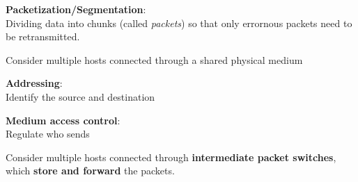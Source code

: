 \begin{frame}\begin{center}\large
	\textbf{Packetization/Segmentation}:\\ \large Dividing data into chunks (called \textit{packets}) 
	so that only errornous packets need to be retransmitted.
\end{center}\end{frame}

\begin{frame}[t]\normalsize
	Consider multiple hosts connected through a shared physical medium
\end{frame}

\begin{frame}\begin{center}\large
	\textbf{Addressing}:\\ Identify the source and destination
\end{center}\end{frame}

\begin{frame}\begin{center}\large
	\textbf{Medium access control}:\\ Regulate who sends
\end{center}\end{frame}

\begin{frame}[t]\normalsize
	Consider multiple hosts connected through \textbf{intermediate packet switches}, 
	which \textbf{store and forward} the packets.
\end{frame}

\begin{frame}[plain]\begin{center}
\end{center}\end{frame}

